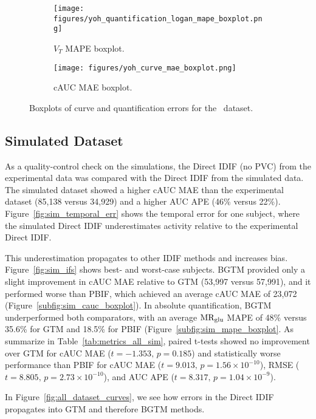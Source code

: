 \begin{figure}[h]
	\centering
	\begin{subfigure}[b]{0.45\textwidth}
		\texttt{[image: figures/yoh\_quantification\_logan\_mape\_boxplot.png]}
		\caption{\(V_T\) MAPE boxplot.}
		\label{subfig:yoh_mape_boxplot}
	\end{subfigure}
	\begin{subfigure}[b]{0.45\textwidth}
		\texttt{[image: figures/yoh\_curve\_mae\_boxplot.png]}
		\caption{cAUC MAE boxplot.}
		\label{subfig:yoh_cauc_boxplot}
	\end{subfigure}
	\caption{Boxplots of curve and quantification errors for the \yohimbine\ dataset.}
	\label{fig:yoh_boxplots}
\end{figure}

\subsection{Simulated Dataset}
As a quality-control check on the simulations, the Direct IDIF (no PVC) from the experimental data was compared with the Direct IDIF from the simulated data.
The simulated dataset showed a higher cAUC MAE than the experimental dataset (85{,}138 versus 34{,}929) and a higher AUC APE (46\% versus 22\%).
Figure~\ref{fig:sim_temporal_err} shows the temporal error for one subject, where the simulated Direct IDIF underestimates activity relative to the experimental Direct IDIF.

This underestimation propagates to other IDIF methods and increases bias.
Figure~\ref{fig:sim_ifs} shows best- and worst-case subjects.
BGTM provided only a slight improvement in cAUC MAE relative to GTM (53{,}997 versus 57{,}991), and it performed worse than PBIF, which achieved an average cAUC MAE of 23{,}072 (Figure~\ref{subfig:sim_cauc_boxplot}).
In absolute quantification, BGTM underperformed both comparators, with an average \(\text{MR}_{\text{glu}}\) MAPE of 48\% versus 35.6\% for GTM and 18.5\% for PBIF (Figure~\ref{subfig:sim_mape_boxplot}.
As summarize in Table~\ref{tab:metrics_all_sim}, paired t-tests showed no improvement over GTM for cAUC MAE (\(t=-1.353,\,p=0.185\)) and statistically worse performance than PBIF for cAUC MAE (\(t=9.013,\,p=1.56\times10^{-10}\)), RMSE (\(t=8.805,\,p=2.73\times10^{-10}\)), and AUC APE (\(t=8.317,\,p=1.04\times10^{-9}\)).

In Figure~\ref{fig:all_dataset_curves}, we see how errors in the Direct IDIF propagates into GTM and therefore BGTM methods.


